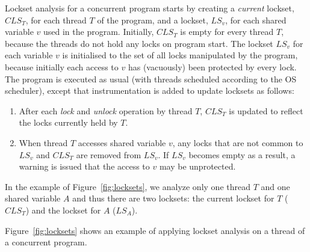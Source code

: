   

Lockset analysis for a concurrent program starts by creating a \emph{current} lockset, $CLS_T$, for each thread $T$ of the program, and a lockset, $LS_v$, for each shared variable $v$ used in the program.
Initially, $CLS_T$ is empty for every thread $T$, because the threads do not hold any locks on program start.
The lockset $LS_v$ for each variable $v$ is initialised to the set of all locks manipulated by the program,
because initially each access to $v$ has (vacuously) been protected by every lock.
The program is executed as usual (with threads scheduled according to the OS scheduler), except that
instrumentation is added to update locksets as follows:
%
\begin{enumerate}
\item After each \emph{lock} and \emph{unlock} operation by thread $T$, $CLS_T$ is updated to reflect the locks currently held by $T$.
\item When thread $T$ accesses shared variable $v$, any locks that are not common to $LS_v$ and $CLS_T$ are removed from $LS_v$.
If $LS_v$ becomes empty as a result, a warning is issued that the access to $v$ may be unprotected.
\end{enumerate}

In the example of Figure~\ref{fig:locksets}, we analyze only one thread $T$ and one shared variable $A$ and thus there are two locksets: the current lockset for $T$ ($CLS_T$) and the lockset for $A$ ($LS_A$). 

Figure~\ref{fig:locksets} shows an example of applying lockset analysis on a thread of a concurrent program.


